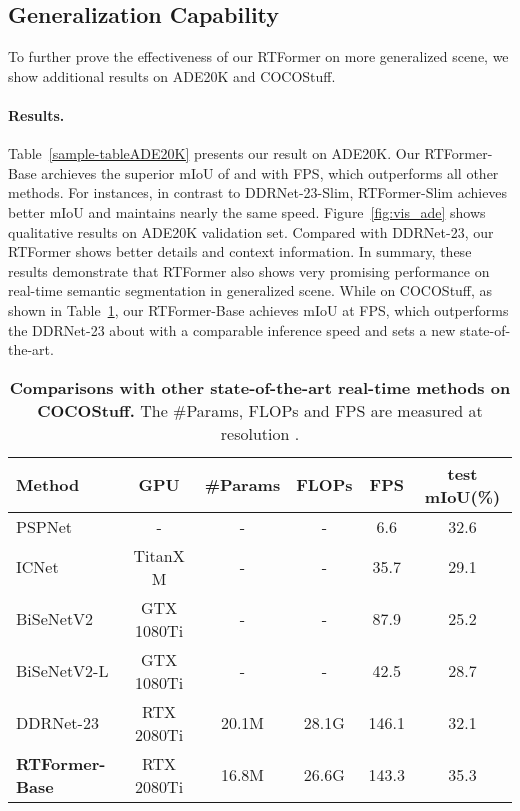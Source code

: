 \documentclass{article}
\begin{document}
\subsection{Generalization Capability}

To further prove the effectiveness of our RTFormer on more generalized scene, we show additional results on ADE20K\cite{ADE20K} and COCOStuff\cite{caesar2018coco}.

\vspace{-2mm}
\paragraph{Results.}
Table~\ref{sample-tableADE20K} presents our result on ADE20K\cite{ADE20K}. Our RTFormer-Base archieves the superior mIoU of  and with FPS, which outperforms all other methods. For instances, in contrast to DDRNet-23-Slim\cite{hong2021deep}, RTFormer-Slim achieves better mIoU  and maintains nearly the same speed. Figure~\ref{fig:vis_ade} shows qualitative results on ADE20K validation set. Compared with DDRNet-23\cite{hong2021deep}, our RTFormer shows better details and context information. In summary, these results demonstrate that RTFormer also shows very promising performance on real-time semantic segmentation in generalized scene. While on COCOStuff, as shown in Table~\ref{sample-tableCOCOStuff}, our RTFormer-Base achieves  mIoU at  FPS, which outperforms the DDRNet-23 about  with a comparable inference speed and sets a new state-of-the-art.

\begin{table}
  \caption{\textbf{Comparisons with other state-of-the-art real-time methods on
COCOStuff.} The \#Params, FLOPs and FPS are measured at resolution .}
  \centering
  \begin{tabular}{l|c|c|c|c|c}
    \toprule
Method 
& GPU
    & \#Params
    & FLOPs &FPS &test mIoU(\%)\\
    \midrule
    PSPNet\cite{zhao2017pyramid}
    & -
    & - & - & 6.6 & 32.6 \\
    ICNet\cite{Zhao_2018_ECCV}
    & TitanX M
    & - & - & 35.7 & 29.1 \\
    BiSeNetV2\cite{yu2021bisenet}
    & GTX 1080Ti
    & - & - & 87.9 & 25.2 \\
    BiSeNetV2-L\cite{yu2021bisenet}
    & GTX 1080Ti
    & - & - & 42.5 & 28.7 \\
    \midrule
    DDRNet-23 
    & RTX 2080Ti
    & 20.1M & 28.1G & 146.1 & 32.1 \\
    \midrule
    \textbf{RTFormer-Base}
    & RTX 2080Ti
    & 16.8M & 26.6G & 143.3 & 35.3 \\
    \bottomrule
\end{tabular}
  \label{sample-tableCOCOStuff}
\end{table}
\end{document}
